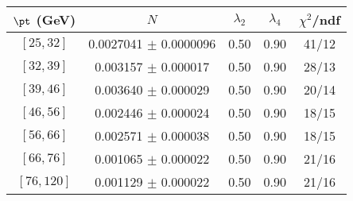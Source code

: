 \begin{tabular}{c||c|c|c|c}
$\pt$ (GeV) & $N$ & $\lambda_{2}$ & $\lambda_4$  & $\chi^2$/ndf  \\
\hline
$[25, 32]$ & 0.0027041 $\pm$ 0.0000096 & 0.50 & 0.90 & 41/12\\
$[32, 39]$ & 0.003157 $\pm$ 0.000017 & 0.50 & 0.90 & 28/13\\
$[39, 46]$ & 0.003640 $\pm$ 0.000029 & 0.50 & 0.90 & 20/14\\
$[46, 56]$ & 0.002446 $\pm$ 0.000024 & 0.50 & 0.90 & 18/15\\
$[56, 66]$ & 0.002571 $\pm$ 0.000038 & 0.50 & 0.90 & 18/15\\
$[66, 76]$ & 0.001065 $\pm$ 0.000022 & 0.50 & 0.90 & 21/16\\
$[76, 120]$ & 0.001129 $\pm$ 0.000022 & 0.50 & 0.90 & 21/16\\
\end{tabular}
